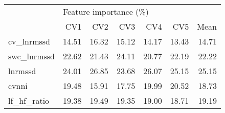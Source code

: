 \begin{tabular}{lrrrrrr}
\toprule
{} & \multicolumn{6}{l}{Feature importance (\%)} \\
{} &                    CV1 &    CV2 &    CV3 &    CV4 &    CV5 &   Mean \\
\midrule
cv\_lnrmssd  &                  14.51 &  16.32 &  15.12 &  14.17 &  13.43 &  14.71 \\
swc\_lnrmssd &                  22.62 &  21.43 &  24.11 &  20.77 &  22.19 &  22.22 \\
lnrmssd     &                  24.01 &  26.85 &  23.68 &  26.07 &  25.15 &  25.15 \\
cvnni       &                  19.48 &  15.91 &  17.75 &  19.99 &  20.52 &  18.73 \\
lf\_hf\_ratio &                  19.38 &  19.49 &  19.35 &  19.00 &  18.71 &  19.19 \\
\bottomrule
\end{tabular}
